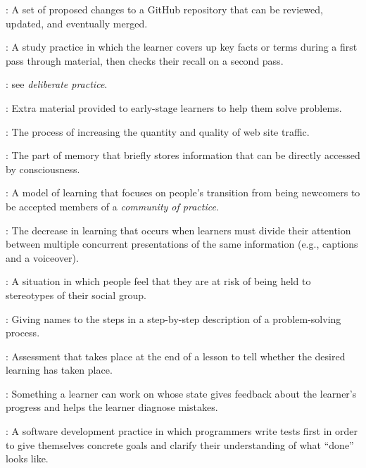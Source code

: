 \begin{description}
: A set of proposed changes to a GitHub
repository that can be reviewed, updated, and eventually merged.

: A study practice in which
the learner covers up key facts or terms during a first pass through material,
then checks their recall on a second pass.

: see \emph{deliberate
  practice}.

: Extra material provided to early-stage
learners to help them solve problems.

: The process of increasing the
quantity and quality of web site traffic.

: The part of memory that briefly
stores information that can be directly accessed by consciousness.

: A model of learning that focuses
on people's transition from being newcomers to be accepted members of a
\emph{community of practice}.

: The decrease in
learning that occurs when learners must divide their attention between multiple
concurrent presentations of the same information (e.g., captions and a
voiceover).

: A situation in which people feel
that they are at risk of being held to stereotypes of their social group.

: Giving names to the steps in a
step-by-step description of a problem-solving process.

: Assessment that takes
place at the end of a lesson to tell whether the desired learning has taken
place.

: Something a learner can work on
whose state gives feedback about the learner's progress and helps the learner
diagnose mistakes.

: A software
development practice in which programmers write tests first in order to give
themselves concrete goals and clarify their understanding of what ``done'' looks
like.


\end{description}
